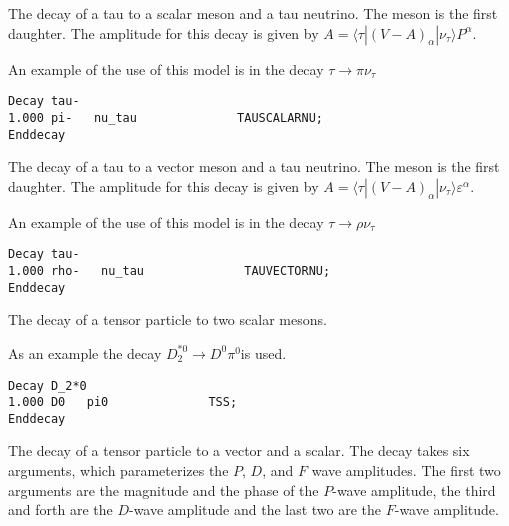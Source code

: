 
\label{tauscalarnu}



\Expl
The decay of a tau to a scalar meson and a tau neutrino.
The meson is the first daughter.
The amplitude for this decay is given by 
$A=\langle \tau | (V-A)_{\alpha} | \nu_{\tau} \rangle P^{\alpha}$.

\Example
An example of the use of this model is in the decay 
$\tau\rightarrow \pi\nu_{\tau}$

\begin{verbatim}
Decay tau-
1.000 pi-   nu_tau              TAUSCALARNU;
Enddecay
\end{verbatim}



\label{tauvector}



\Expl
The decay of a tau to a vector meson and a tau neutrino.
The meson is the first daughter.
The amplitude for this decay is given by 
$A=\langle \tau | (V-A)_{\alpha} | \nu_{\tau} \rangle \varepsilon^{\alpha}$.

\Example
An example of the use of this model is in the decay 
$\tau\rightarrow \rho\nu_{\tau}$

\begin{verbatim}
Decay tau-
1.000 rho-   nu_tau              TAUVECTORNU;
Enddecay
\end{verbatim}




\label{tss}



\Expl
The decay of a tensor particle to two scalar mesons.

\Example
As an example the decay $D_2^{*0}\rightarrow D^0\pi^0$is used.
\begin{verbatim}
Decay D_2*0
1.000 D0   pi0              TSS;
Enddecay
\end{verbatim}






\Expl
The decay of a tensor particle to a vector and a scalar. The decay
takes six arguments, which parameterizes the $P$, $D$, and $F$
wave amplitudes. The first two arguments are the magnitude 
and the phase of the $P$-wave amplitude, the third and forth
are the $D$-wave amplitude and the last two are the $F$-wave
amplitude. 

